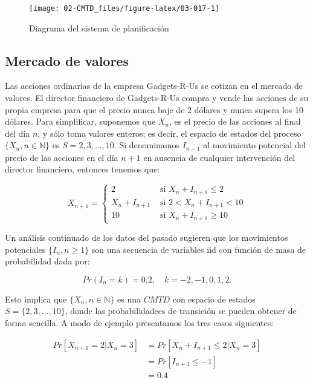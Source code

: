 \documentclass[
]{book}
\theoremstyle{definition}
\theoremstyle{definition}
\theoremstyle{definition}
\theoremstyle{definition}
\theoremstyle{remark}
\begin{document}
\begin{figure}

{\centering \texttt{[image: 02-CMTD\_files/figure-latex/03-017-1]} 

}

\caption{Diagrama del sistema de planificación}\label{fig:03-017}
\end{figure}

\hypertarget{mercadovalores}{%
\subsection{Mercado de valores}\label{mercadovalores}}

Las acciones ordinarias de la empresa Gadgets-R-Us se cotizan en el mercado de valores. El director financiero de Gadgets-R-Us compra y vende las acciones de su propia empresa para que el precio nunca baje de 2 dólares y nunca supera los 10 dólares. Para simplificar, suponemos que \(X_n\), es el precio de las acciones al final del día \(n\), y sólo toma valores enteros; es decir, el espacio de estados del proceso \(\{X_n, n \in \mathbb{N}\}\) es \(S = 2, 3,...,10\). Si denominamos \(I_{n+1}\) al movimiento potencial del precio de las acciones en el día \(n+1\) en ausencia de cualquier intervención del director financiero, entonces tenemos que:

\begin{equation*}
X_{n+1} =  
\begin{cases}
2 & \text{ si } X_n + I_{n+1} \leq 2\\
X_n + I_{n+1} & \text{ si } 2 < X_n + I_{n+1} < 10\\
10 & \text{ si }  X_n + I_{n+1} \geq 10
\end{cases}
\end{equation*}

Un análisis continuado de los datos del pasado sugieren que los movimientos potenciales \(\{I_n, n \geq 1\}\) son una secuencia de variables iid con función de masa de probabilidad dada por:

\[Pr(I_n = k) = 0.2, \quad k = -2, -1, 0, 1, 2.\]

Esto implica que \(\{X_n, n \in \mathbb{N}\}\) es una \(CMTD\) con espacio de estados \(S = \{2, 3,...,10\}\), donde las probabilidadees de transición se pueden obtener de forma sencilla. A modo de ejemplo presentamos los tres casos siguientes:

\[\begin{array}{ll}
Pr[X_{n+1} = 2 | X_n = 3] & = Pr[X_n + I_{n+1} \leq 2 | X_n = 3]\\
& = Pr[I_{n+1} \leq -1]\\
& = 0.4
\end{array}\]
\end{document}
